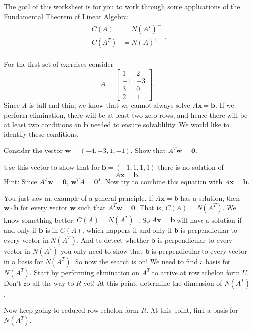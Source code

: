 \documentclass[minion]{homework}
\def\vw{\mathbf{w}}
\def\vx{\mathbf{x}}
\def\vb{\mathbf{b}}
\def\vzero{\mathbf{0}}
\begin{document}
\begin{aproblems}
\vskip 0.5cm

The goal of this worksheet is for you to work through some applications
of the Fundamental Theorem of Linear Algebra:
\[
\begin{aligned}
C(A) &= N(A^T)^\perp\\
C(A^T) &= N(A)^\perp \\
\end{aligned}.
\]

For the first set of exercises consider
\[
A = \begin{bmatrix} 1 & 2 \\
-1 & -3 \\
3 & 0 \\
2 & 1
\end{bmatrix}.
\]
Since $A$ is tall and thin, we know that we cannot always solve
$A\mathbf x = \mathbf b$.  If we perform elimination, there will be 
at least two zero rows, and hence there will be at least two conditions
on $\mathbf b$ needed to ensure solvablility.  We would like to identify
these conditions.

\aproblem Consider the vector $\mathbf w = (-4, -3, 1, -1)$.  Show
that $A^T\mathbf{ w}=\mathbf{ 0}$.

\aproblem Use this vector to show that for $\mathbf{b}=(-1,1,1,1)$ there is
no solution of
\[
A\mathbf{x} = \mathbf{b}.
\]
Hint: Since $A^T\vw = \vzero$, $\vw^T A = \vzero^T $.  Now
try to combine this equation with $A\vx = \vb$.

\aproblem You just saw an example of a general principle.  If $A \mathbf x =  \mathbf b$ has a solution, then $\mathbf w \cdot \mathbf b$ for every
vector $\mathbf w$ such that $A^T\mathbf{w}=\mathbf 0$.  That is,
$C(A)\perp N(A^T)$.  We know something better: $C(A)= N(A^T)^\perp$.
So $A\mathbf x = \mathbf b$ will have a solution if and only if
$\mathbf b$ is in $C(A)$, which happens if and only if $\mathbf b$
is perpendicular to every vector in $N(A^T)$. And to detect
whether $\mathbf b$ is perpendicular to every vector in $N(A^T)$
you only need to show that $\mathbf b$ is perpendicular to every vector
in a basis for $N(A^T)$.  So now the search is on! We need to find a
basis for $N(A^T)$.  Start by performing elimination on $A^T$ to
arrive at row echelon form $U$.  Don't go all the way to $R$ yet!  At this point,
determine the dimension of $N(A^T)$.

\aproblem Now keep going to reduced row echelon form $R$. At this point,
find a basis for $N(A^T)$.


\end{aproblems}
\end{document}
